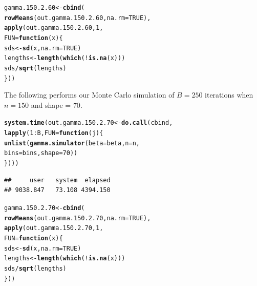 \documentclass[11pt]{article}\usepackage[]{graphicx}\usepackage[]{color}
\makeatletter
\newcommand{\hlnum}[1]{\textcolor[rgb]{0.686,0.059,0.569}{#1}}%
\newcommand{\hlopt}[1]{\textcolor[rgb]{0,0,0}{#1}}%
\newcommand{\hlstd}[1]{\textcolor[rgb]{0.345,0.345,0.345}{#1}}%
\newcommand{\hlkwa}[1]{\textcolor[rgb]{0.161,0.373,0.58}{\textbf{#1}}}%
\newcommand{\hlkwb}[1]{\textcolor[rgb]{0.69,0.353,0.396}{#1}}%
\newcommand{\hlkwc}[1]{\textcolor[rgb]{0.333,0.667,0.333}{#1}}%
\newcommand{\hlkwd}[1]{\textcolor[rgb]{0.737,0.353,0.396}{\textbf{#1}}}%
\newenvironment{kframe}{%
 \def\at@end@of@kframe{}%
 \ifinner\ifhmode%
  \def\at@end@of@kframe{\end{minipage}}%
  \begin{minipage}{\columnwidth}%
 \fi\fi%
 \def\FrameCommand##1{\hskip\@totalleftmargin \hskip-\fboxsep
 \colorbox{shadecolor}{##1}\hskip-\fboxsep
     \hskip-\linewidth \hskip-\@totalleftmargin \hskip\columnwidth}%
 \MakeFramed {\advance\hsize-\width
   \@totalleftmargin\z@ \linewidth\hsize
   \@setminipage}}%
 {\par\unskip\endMakeFramed%
 \at@end@of@kframe}
\newenvironment{knitrout}{}{} %
\makeatother
\begin{document}
\begin{knitrout}
\color{fgcolor}\begin{kframe}
\begin{alltt}
\hlstd{gamma.150.2.60} \hlkwb{<-} \hlkwd{cbind}\hlstd{(}
  \hlkwd{rowMeans}\hlstd{(out.gamma.150.2.60,} \hlkwc{na.rm} \hlstd{=} \hlnum{TRUE}\hlstd{),}
  \hlkwd{apply}\hlstd{(out.gamma.150.2.60,} \hlnum{1}\hlstd{,}
  \hlkwc{FUN} \hlstd{=} \hlkwa{function}\hlstd{(}\hlkwc{x}\hlstd{)\{}
    \hlstd{sds} \hlkwb{<-} \hlkwd{sd}\hlstd{(x,} \hlkwc{na.rm} \hlstd{=} \hlnum{TRUE}\hlstd{)}
    \hlstd{lengths} \hlkwb{<-} \hlkwd{length}\hlstd{(}\hlkwd{which}\hlstd{(}\hlopt{!}\hlkwd{is.na}\hlstd{(x)))}
    \hlstd{sds} \hlopt{/} \hlkwd{sqrt}\hlstd{(lengths)}
  \hlstd{\}))}
\end{alltt}
\end{kframe}
\end{knitrout}

The following performs our Monte Carlo simulation of $B = 250$ iterations 
when $n = 150$ and shape = $70$.

\begin{knitrout}
\color{fgcolor}\begin{kframe}
\begin{alltt}
\hlkwd{system.time}\hlstd{(out.gamma.150.2.70} \hlkwb{<-} \hlkwd{do.call}\hlstd{(cbind,}
  \hlkwd{lapply}\hlstd{(}\hlnum{1}\hlopt{:}\hlstd{B,} \hlkwc{FUN} \hlstd{=} \hlkwa{function}\hlstd{(}\hlkwc{j}\hlstd{)\{}
    \hlkwd{unlist}\hlstd{(}\hlkwd{gamma.simulator}\hlstd{(}\hlkwc{beta} \hlstd{= beta,} \hlkwc{n} \hlstd{= n,}
      \hlkwc{bins} \hlstd{= bins,} \hlkwc{shape} \hlstd{=} \hlnum{70}\hlstd{))}
\hlstd{\})))}
\end{alltt}
\begin{verbatim}
##     user   system  elapsed 
## 9038.847   73.108 4394.150
\end{verbatim}
\end{kframe}
\end{knitrout}

\begin{knitrout}
\color{fgcolor}\begin{kframe}
\begin{alltt}
\hlstd{gamma.150.2.70} \hlkwb{<-} \hlkwd{cbind}\hlstd{(}
  \hlkwd{rowMeans}\hlstd{(out.gamma.150.2.70,} \hlkwc{na.rm} \hlstd{=} \hlnum{TRUE}\hlstd{),}
  \hlkwd{apply}\hlstd{(out.gamma.150.2.70,} \hlnum{1}\hlstd{,}
  \hlkwc{FUN} \hlstd{=} \hlkwa{function}\hlstd{(}\hlkwc{x}\hlstd{)\{}
    \hlstd{sds} \hlkwb{<-} \hlkwd{sd}\hlstd{(x,} \hlkwc{na.rm} \hlstd{=} \hlnum{TRUE}\hlstd{)}
    \hlstd{lengths} \hlkwb{<-} \hlkwd{length}\hlstd{(}\hlkwd{which}\hlstd{(}\hlopt{!}\hlkwd{is.na}\hlstd{(x)))}
    \hlstd{sds} \hlopt{/} \hlkwd{sqrt}\hlstd{(lengths)}
  \hlstd{\}))}
\end{alltt}
\end{kframe}
\end{knitrout}
\end{document}
